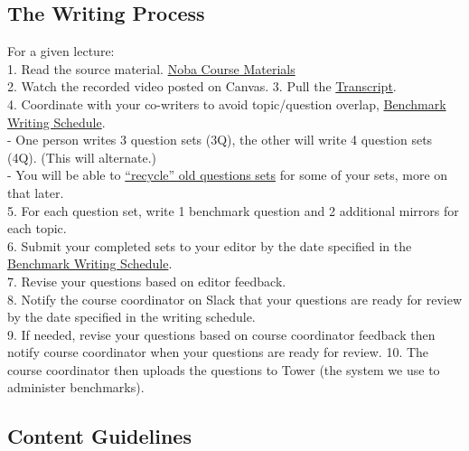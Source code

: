 \documentclass[
]{article}
\begin{document}
\hypertarget{the-writing-process}{%
\subsection{The Writing Process}\label{the-writing-process}}

For a given lecture:\\
1. Read the source material. \href{https://utexas.instructure.com/courses/1425333}{Noba Course Materials}\\
2. Watch the recorded video posted on Canvas.
3. Pull the \href{https://utexas.app.box.com/s/gv30palwx7zhqfk43vgvy8450ci0qz66/folder/333986317433}{Transcript}.\\
4. Coordinate with your co-writers to avoid topic/question overlap, \href{https://docs.google.com/spreadsheets/d/1hingHbcfSHpUr1Km8NF4nnrDgw5ivD6b/edit?gid=602524248\#gid=602524248}{Benchmark Writing Schedule}.\\
- One person writes 3 question sets (3Q), the other will write 4 question sets (4Q). (This will alternate.)\\
- You will be able to \protect\hyperlink{recycling-benchmark-questions}{``recycle'' old questions sets} for some of your sets, more on that later.\\
5. For each question set, write 1 benchmark question and 2 additional mirrors for each topic.\\
6. Submit your completed sets to your editor by the date specified in the \href{https://docs.google.com/spreadsheets/d/1hingHbcfSHpUr1Km8NF4nnrDgw5ivD6b/edit?gid=602524248\#gid=602524248}{Benchmark Writing Schedule}.\\
7. Revise your questions based on editor feedback.\\
8. Notify the course coordinator on Slack that your questions are ready for review by the date specified in the writing schedule.\\
9. If needed, revise your questions based on course coordinator feedback then notify course coordinator when your questions are ready for review.
10. The course coordinator then uploads the questions to Tower (the system we use to administer benchmarks).

\hypertarget{content-guidelines}{%
\subsection{Content Guidelines}\label{content-guidelines}}
\end{document}
